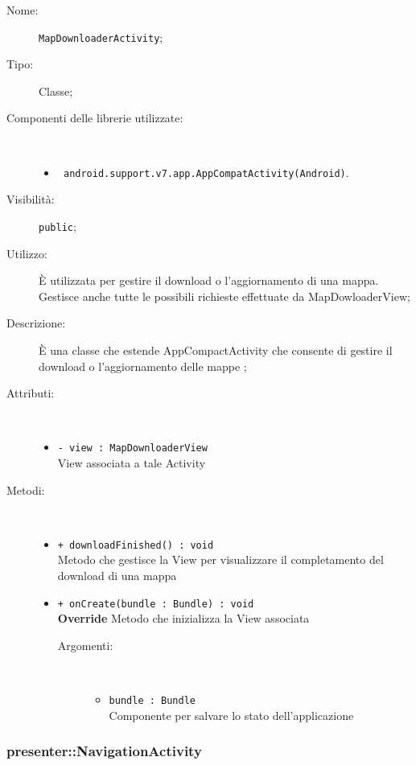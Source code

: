 \documentclass[../DefinizioneDiProdotto.tex]{subfiles}
\begin{document}
    \begin{description}
\item[Nome:] \texttt{MapDownloaderActivity};
\item[Tipo:] Classe;
\item[Componenti delle librerie utilizzate:] \
\begin{itemize}
\item \texttt{ android.support.v7.app.AppCompatActivity(Android)}.

\end{itemize}
\item[Visibilità:] \texttt{public};
\item[Utilizzo:] È utilizzata per gestire il download o l'aggiornamento di una mappa. Gestisce anche tutte le possibili richieste effettuate da MapDowloaderView;
\item[Descrizione:] È una classe che estende AppCompactActivity che consente di gestire il download o l'aggiornamento delle mappe
;
\item[Attributi:] \
\begin{itemize}
\item \texttt{- view : MapDownloaderView}\\
View associata a tale Activity

\end{itemize}
\item[Metodi:] \
\begin{itemize}
\item \texttt{+ downloadFinished() : void}\\
Metodo che gestisce la View per visualizzare il completamento del download di una mappa
 \item \texttt{+ onCreate(bundle : Bundle) : void}\\
\textbf{Override} Metodo che inizializza la View associata
 \begin{description}
\item[Argomenti:] \
\begin{itemize}
\item \texttt{bundle : Bundle}\\
Componente per salvare lo stato dell'applicazione\end{itemize}
\end{description}
\end{itemize}
\end{description}

\subsubsection{presenter::NavigationActivity}
\end{document}
